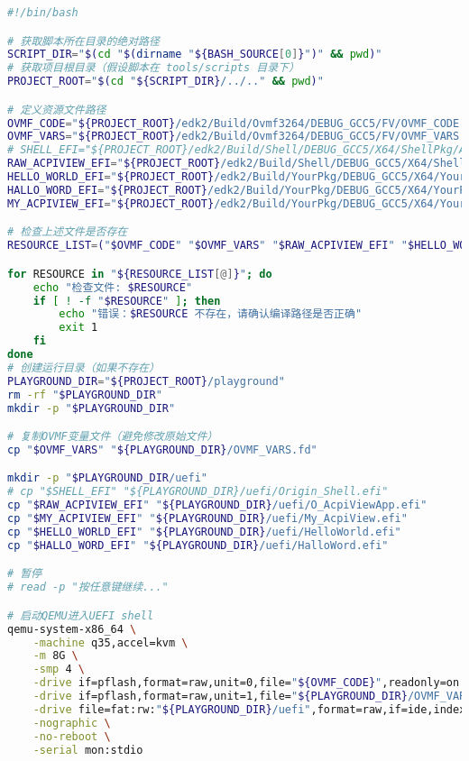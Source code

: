 \begin{lstlisting}[language=bash]
#!/bin/bash

# 获取脚本所在目录的绝对路径
SCRIPT_DIR="$(cd "$(dirname "${BASH_SOURCE[0]}")" && pwd)"
# 获取项目根目录（假设脚本在 tools/scripts 目录下）
PROJECT_ROOT="$(cd "${SCRIPT_DIR}/../.." && pwd)"

# 定义资源文件路径
OVMF_CODE="${PROJECT_ROOT}/edk2/Build/Ovmf3264/DEBUG_GCC5/FV/OVMF_CODE.fd"
OVMF_VARS="${PROJECT_ROOT}/edk2/Build/Ovmf3264/DEBUG_GCC5/FV/OVMF_VARS.fd"
# SHELL_EFI="${PROJECT_ROOT}/edk2/Build/Shell/DEBUG_GCC5/X64/ShellPkg/Application/Shell/EA4BB293-2D7F-4456-A681-1F22F42CD0BC/DEBUG/Shell.efi"
RAW_ACPIVIEW_EFI="${PROJECT_ROOT}/edk2/Build/Shell/DEBUG_GCC5/X64/ShellPkg/Application/AcpiViewApp/AcpiViewApp/DEBUG/AcpiViewApp.efi"
HELLO_WORLD_EFI="${PROJECT_ROOT}/edk2/Build/YourPkg/DEBUG_GCC5/X64/YourPkg/Application/HelloWorld/HelloWorld/DEBUG/HelloWorld.efi"
HALLO_WORD_EFI="${PROJECT_ROOT}/edk2/Build/YourPkg/DEBUG_GCC5/X64/YourPkg/Application/HalloWord/HalloWord/DEBUG/HalloWord.efi"
MY_ACPIVIEW_EFI="${PROJECT_ROOT}/edk2/Build/YourPkg/DEBUG_GCC5/X64/YourPkg/Application/AcpiView/AcpiView/DEBUG/AcpiView.efi"

# 检查上述文件是否存在
RESOURCE_LIST=("$OVMF_CODE" "$OVMF_VARS" "$RAW_ACPIVIEW_EFI" "$HELLO_WORLD_EFI" "$HALLO_WORD_EFI" "$MY_ACPIVIEW_EFI")

for RESOURCE in "${RESOURCE_LIST[@]}"; do
	echo "检查文件: $RESOURCE"
	if [ ! -f "$RESOURCE" ]; then
		echo "错误：$RESOURCE 不存在，请确认编译路径是否正确"
		exit 1
	fi
done
# 创建运行目录（如果不存在）
PLAYGROUND_DIR="${PROJECT_ROOT}/playground"
rm -rf "$PLAYGROUND_DIR"
mkdir -p "$PLAYGROUND_DIR"

# 复制OVMF变量文件（避免修改原始文件）
cp "$OVMF_VARS" "${PLAYGROUND_DIR}/OVMF_VARS.fd"

mkdir -p "$PLAYGROUND_DIR/uefi"
# cp "$SHELL_EFI" "${PLAYGROUND_DIR}/uefi/Origin_Shell.efi"
cp "$RAW_ACPIVIEW_EFI" "${PLAYGROUND_DIR}/uefi/O_AcpiViewApp.efi"
cp "$MY_ACPIVIEW_EFI" "${PLAYGROUND_DIR}/uefi/My_AcpiView.efi"
cp "$HELLO_WORLD_EFI" "${PLAYGROUND_DIR}/uefi/HelloWorld.efi"
cp "$HALLO_WORD_EFI" "${PLAYGROUND_DIR}/uefi/HalloWord.efi"

# 暂停
# read -p "按任意键继续..."

# 启动QEMU进入UEFI shell
qemu-system-x86_64 \
	-machine q35,accel=kvm \
	-m 8G \
	-smp 4 \
	-drive if=pflash,format=raw,unit=0,file="${OVMF_CODE}",readonly=on \
	-drive if=pflash,format=raw,unit=1,file="${PLAYGROUND_DIR}/OVMF_VARS.fd" \
	-drive file=fat:rw:"${PLAYGROUND_DIR}/uefi",format=raw,if=ide,index=0 \
	-nographic \
	-no-reboot \
	-serial mon:stdio

\end{lstlisting}